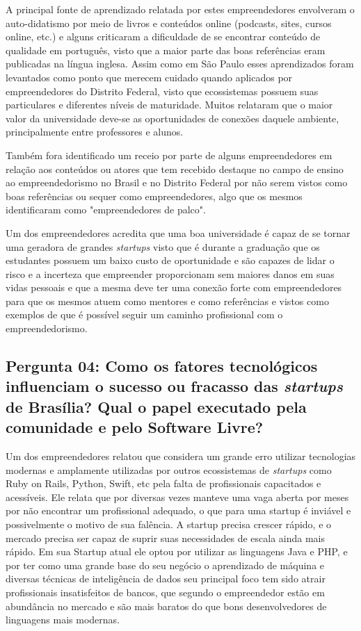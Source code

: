 A principal fonte de aprendizado relatada por estes empreendedores envolveram o auto-didatismo por meio de livros e conteúdos online (podcasts, sites, cursos online, etc.) e alguns criticaram a dificuldade de se encontrar conteúdo de qualidade em português, visto que a maior parte das boas referências eram publicadas na língua inglesa. Assim como em São Paulo esses aprendizados foram levantados como ponto que merecem cuidado quando aplicados por empreendedores do Distrito Federal, visto que ecossistemas possuem suas particulares e diferentes níveis de maturidade. Muitos relataram que o maior valor da universidade deve-se as oportunidades de conexões daquele ambiente, principalmente entre professores e alunos.

Também fora identificado um receio por parte de alguns empreendedores em relação aos conteúdos ou atores que tem recebido destaque no campo de ensino ao empreendedorismo no Brasil e no Distrito Federal por não serem vistos como boas referências ou sequer como empreendedores, algo que os mesmos identificaram como "empreendedores de palco".

Um dos empreendedores acredita que uma boa universidade é capaz de se tornar uma geradora de grandes \textit{startups} visto que é durante a graduação que os estudantes possuem um baixo custo de oportunidade e são capazes de lidar o risco e a incerteza que empreender proporcionam sem maiores danos em suas vidas pessoais e que a mesma deve ter uma conexão forte com empreendedores para que os mesmos atuem como mentores e como referências e vistos como exemplos de que é possível seguir um caminho profissional com o empreendedorismo.

\subsection*{Pergunta 04: Como os fatores tecnológicos influenciam o sucesso ou fracasso das \textit{startups} de Brasília? Qual o papel executado pela comunidade e pelo Software Livre?}
\label{subsection:pergunta_de_pesquisa_4}

Um dos empreendedores relatou que considera um grande erro utilizar tecnologias modernas e amplamente utilizadas por outros ecossistemas de \textit{startups} como Ruby on Rails, Python, Swift, etc pela falta de profissionais capacitados e acessíveis. Ele relata que por diversas vezes manteve uma vaga aberta por meses por não encontrar um profissional adequado, o que para uma startup é inviável e possivelmente o motivo de sua falência. A startup precisa crescer rápido, e o mercado precisa ser capaz de suprir suas necessidades de escala ainda mais rápido. Em sua Startup atual ele optou por utilizar as linguagens Java e PHP, e por ter como uma grande base do seu negócio o aprendizado de máquina e diversas técnicas de inteligência de dados seu principal foco tem sido atrair profissionais insatisfeitos de bancos, que segundo o empreendedor estão em abundância no mercado e são mais baratos do que bons desenvolvedores de linguagens mais modernas. 


